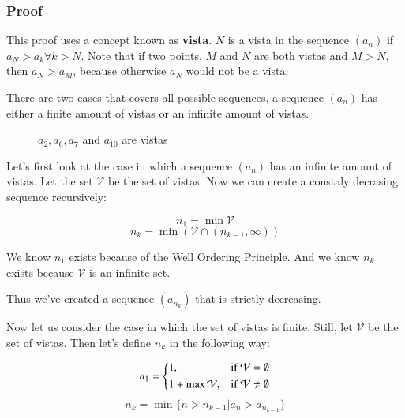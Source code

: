 \documentclass [12 pt, twoside] {book}
\newcommand\+{\text{ }}
\begin{document}
\subsubsection{Proof}
This proof uses a concept known as \textbf{vista}. $N$ is a vista in the
sequence $(a_n)$ if $a_N > a_k \forall k > N$. Note that if two points, $M$ and
$N$ are both vistas and $M > N$, then $a_N > a_M$, because otherwise $a_N$ would
not be a vista.

There are two cases that covers all possible sequences, a sequence $(a_n)$ has
either a finite amount of vistas or an infinite amount of vistas.

\begin{figure}[ht]
\centering
{}
\caption{$a_2, a_6, a_7$ and $a_10$ are vistas}
\end{figure}

Let's first look at the case in which a sequence $(a_n)$ has an infinite amount
of vistas. Let the set $\mathcal{V}$ be the set of vistas. Now we can create a
constaly decrasing sequence recursively:

$$n_1 = \min{\mathcal{V}}$$
$$n_k = \min{(\mathcal{V} \cap (n_{k-1}, \infty))}$$

We know $n_1$ exists because of the Well Ordering Principle.
And we know $n_k$ exists because $\mathcal{V}$ is an infinite set.

Thus we've created a sequence $(a_{n_k})$ that is strictly decreasing.

Now let us consider the case in which the set of vistas is finite. Still, let
$\mathcal{V}$ be the set of vistas. Then let's define $n_k$ in the following
way:

\[
        n_1 =
        \begin{dcases}
            1, & \text{if } \mathcal{V} = \emptyset\\
            1 + \max{\mathcal{V}}, & \text{if } \mathcal{V} \neq \emptyset
        \end{dcases}
\]
$$n_k = \min{\{n > n_{k-1} | a_n > a_{n_{k-1}}\}}$$
\end{document}
